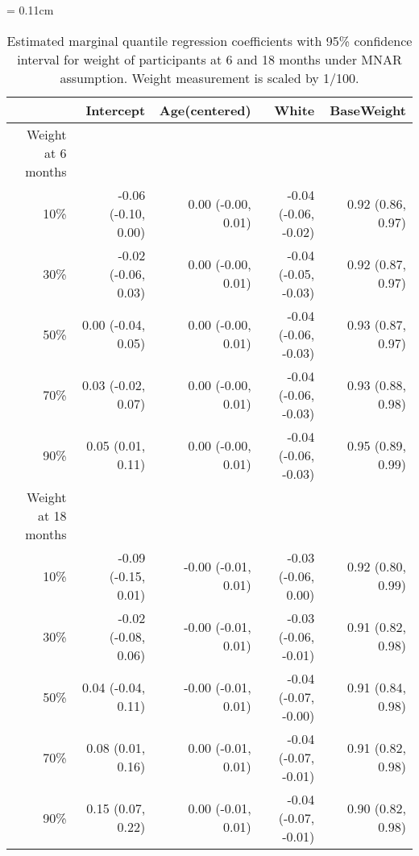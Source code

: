 \documentclass[12pt]{article}
\begin{document}
\begin{table}
  \renewcommand{\arraystretch}{1.3}
  \begin{center}
    \caption{Estimated marginal quantile regression coefficients with
      95\% confidence interval for weight of participants at 6 and 18
      months under MNAR assumption. Weight measurement is scaled by
      1/100.}\label{tab:toursmnar}
    \vspace{10pt} \tabcolsep = 0.11cm
    \begin{tabular}{rrrrr}
      \toprule
      & Intercept           & Age(centered)       & White                & BaseWeight        \\
      \hline
      Weight at 6 months                                                                          \\
      10\%  & -0.06 (-0.10, 0.00) & 0.00 (-0.00, 0.01)  & -0.04 (-0.06, -0.02) & 0.92 (0.86, 0.97) \\
      30\% & -0.02 (-0.06, 0.03) & 0.00 (-0.00, 0.01)  & -0.04 (-0.05, -0.03) & 0.92 (0.87, 0.97) \\
      50\% & 0.00 (-0.04, 0.05)  & 0.00 (-0.00, 0.01)  & -0.04 (-0.06, -0.03) & 0.93 (0.87, 0.97) \\
      70\% & 0.03 (-0.02, 0.07)  & 0.00 (-0.00, 0.01)  & -0.04 (-0.06, -0.03) & 0.93 (0.88, 0.98) \\
      90\% & 0.05 (0.01, 0.11)   & 0.00 (-0.00, 0.01)  & -0.04 (-0.06, -0.03) & 0.95 (0.89, 0.99) \\
      Weight at 18 months                                                                         \\
      10\% & -0.09 (-0.15, 0.01) & -0.00 (-0.01, 0.01) & -0.03 (-0.06, 0.00)  & 0.92 (0.80, 0.99) \\
      30\% & -0.02 (-0.08, 0.06) & -0.00 (-0.01, 0.01) & -0.03 (-0.06, -0.01) & 0.91 (0.82, 0.98) \\
      50\% & 0.04 (-0.04, 0.11)  & -0.00 (-0.01, 0.01) & -0.04 (-0.07, -0.00) & 0.91 (0.84, 0.98) \\
      70\% & 0.08 (0.01, 0.16)   & 0.00 (-0.01, 0.01)  & -0.04 (-0.07, -0.01) & 0.91 (0.82, 0.98) \\
      90\% & 0.15 (0.07, 0.22)   & 0.00 (-0.01, 0.01)  & -0.04 (-0.07, -0.01) & 0.90 (0.82, 0.98) \\
      \bottomrule
    \end{tabular}
  \end{center}
\end{table}
\end{document}
